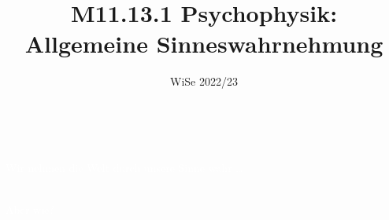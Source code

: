 \documentclass{beamer}
\title[M11.13.1 Psychophysik]{M11.13.1 Psychophysik: \\ Allgemeine Sinneswahrnehmung}
\author[melanie.stefan@medicalschool-berlin.de]{}
\institute[]{Prof. Melanie Stefan \\ melanie.stefan@medcialschool-berlin.de}
\date{WiSe 2022/23}
\begin{document}
{  
\begin{frame}

 \maketitle 

$\,$\\[6cm] 


\end{frame} 
}



{  
\begin{frame}
\textcolor{white}{Wir nehmen die Welt durch unsere Sinne wahr \dots}

$\,$\\[3.5cm]

\pause
\textcolor{white}{Aber wie?}

$\,$\\[4cm]

\end{frame}
}
\end{document}
